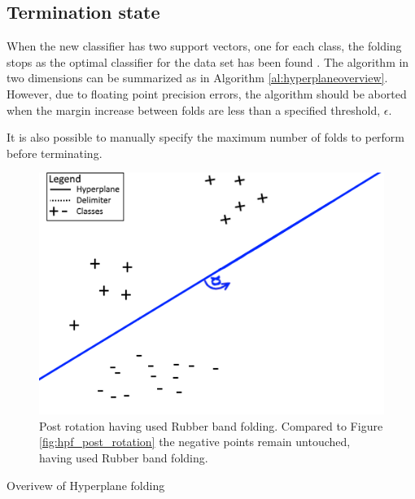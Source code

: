 \documentclass[a4paper,twoside]{bth}
\begin{document}
\subsection{Termination state}
When the new classifier has two support vectors, one for each class, the folding stops as the optimal classifier for the data set has been found \cite{unpublished}. The algorithm in two dimensions can be summarized as in Algorithm \ref{al:hyperplaneoverview}. However, due to floating point precision errors, the algorithm should be aborted when the margin increase between folds are less than a specified threshold, $\epsilon$. 
\par It is also possible to manually specify the maximum number of folds to perform before terminating.
\begin{figure}
\centering
\includegraphics[scale=1]{images/intro-images/rubberbandExplanation2.png}

   \caption{Post rotation having used Rubber band folding. Compared to Figure \ref{fig:hpf_post_rotation} the negative points remain untouched, having used Rubber band folding.}
   \label{fig:rbf_post_rotation}
\end{figure}

\begin{algorithm}\label{al:hyperplaneoverview}
 
 \caption{Overivew of Hyperplane folding}
\end{algorithm}
\end{document}

